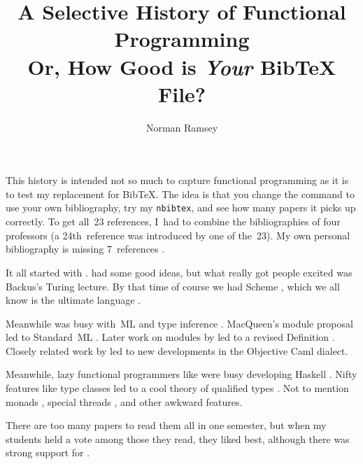 \documentclass[twocolumn]{article}
\title{A Selective History of Functional Programming\\
        {\large Or, How Good is \emph{Your} Bib{\TeX} File?}}
\author{Norman Ramsey}
\begin{document}
\maketitle
\small

This history is intended not so much to capture functional programming
as it is to test my replacement for Bib{\TeX}.
The idea is that you change the
\verb++ command to use your own bibliography,
try my \texttt{nbibtex}, and see how many papers it picks up
correctly.
To get all~23 references, I~had to combine the bibliographies of four
professors (a 24th~reference was introduced by one of the~23). 
My own personal bibliography is missing 7~references
\citep{iverson::book,
  :lambda-ultimate-declarative,
  backus:liberate-neumann,
  macqueen:modules-for-ml,
  milner-tofte-harper:definition:1990,
  jones:qualified-types:book,
  peyton-jones-launchbury:lazy-functional-state-threads:in}.




It all started with \cite{mccarthy:symbolic-recursive}.
\cite{iverson::book} had some good ideas, but what really got people
excited was Backus's \citeyearpar{backus:liberate-neumann}
Turing lecture.
By that time of course we had Scheme \citep{sussman-steele:scheme:197},
which we all know is the ultimate language
 \citep{:lambda-ultimate-imperative,:lambda-ultimate-declarative,:lambda-ultimate-goto}.

Meanwhile \cite{milner:type-polymorphism-programming} was busy with~ML
and type inference \citep{damas-milner}.
MacQueen's \citeyearpar{macqueen:modules-for-ml} module proposal led to
Standard~ML \citep{milner-tofte-harper:definition:1990}.
Later work on modules by \cite{harper-lillibridge:sharing} led to
a revised Definition
\citep{milner-tofte-macqueen-harper}.
Closely related work by
\cite{leroy:modules:1994,leroy:functors:1995,leroy:modular-module-system}
led to new developments in the Objective Caml dialect.

Meanwhile, lazy functional programmers like
\cite{hughes:why-functional-matters} were busy developing Haskell 
\citep{peyton-jones:haskell:book}.
Nifty features like type classes
\citep{wadler-blott:ad-hoc-polymorphism} led to a cool theory of
qualified types \citep{jones:qualified-types:book}.
Not to mention monads \citep{wadler:essence-functional},
special threads
\citep{peyton-jones-launchbury:lazy-functional-state-threads:in},
and other awkward \citep{peyton-jones:awkward-squad} features.

There are too many papers to read them all in one semester, but when
my students held a vote among those they read, they liked
\cite{wadler-blott} best, although there was strong support for
\cite{leroy:separate-compilation}. 



\providecommand\includeftpref{} %


\end{document}
